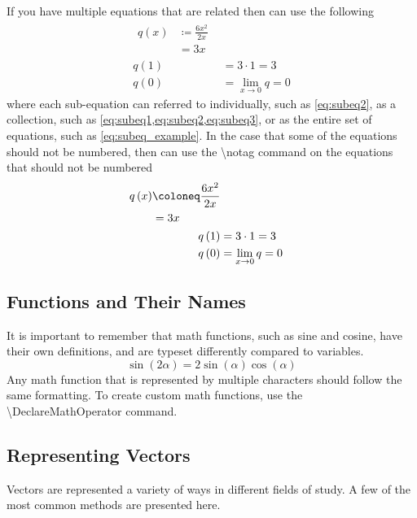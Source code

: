 If you have multiple equations that are related then can use the following
\begin{subequations} \label{eq:subeq_example}
	\begin{align}
		\begin{split}
			q\left(x\right) & \coloneq\frac{6x^2}{2x} \\
			                & =3x
		\end{split} \label{eq:subeq1} \\
		q\left(1\right)
		 & =3\cdot 1=3 \label{eq:subeq2}          \\
		q\left(0\right)
		 & =\lim_{x\to 0} q=0 \label{eq:subeq3}
	\end{align}
\end{subequations}
where each sub-equation can referred to individually, such as \cref{eq:subeq2}, as a collection, such as \cref{eq:subeq1,eq:subeq2,eq:subeq3}, or as the entire set of equations, such as \cref{eq:subeq_example}.
In the case that some of the equations should not be numbered, then can use the \textbackslash notag command on the equations that should not be numbered
\begin{subequations}
	\begin{align}
		\begin{split}
			q\left(x\right)
			 & \coloneq\frac{6x^2}{2x} \\
			 & =3x
		\end{split} \\
		q\left(1\right)
		 & =3\cdot 1=3 \notag      \\
		q\left(0\right)
		 & =\lim_{x\to 0} q=0
	\end{align}
\end{subequations}

\subsection{Functions and Their Names}
It is important to remember that math functions, such as sine and cosine, have their own definitions, and are typeset differently compared to variables.
\begin{equation}
	\sin\left(2\alpha\right)=2\sin\left(\alpha\right)\cos\left(\alpha\right)
\end{equation}
Any math function that is represented by multiple characters should follow the same formatting.
To create custom math functions, use the \textbackslash DeclareMathOperator command.

\subsection{Representing Vectors}
Vectors are represented a variety of ways in different fields of study.
A few of the most common methods are presented here.

